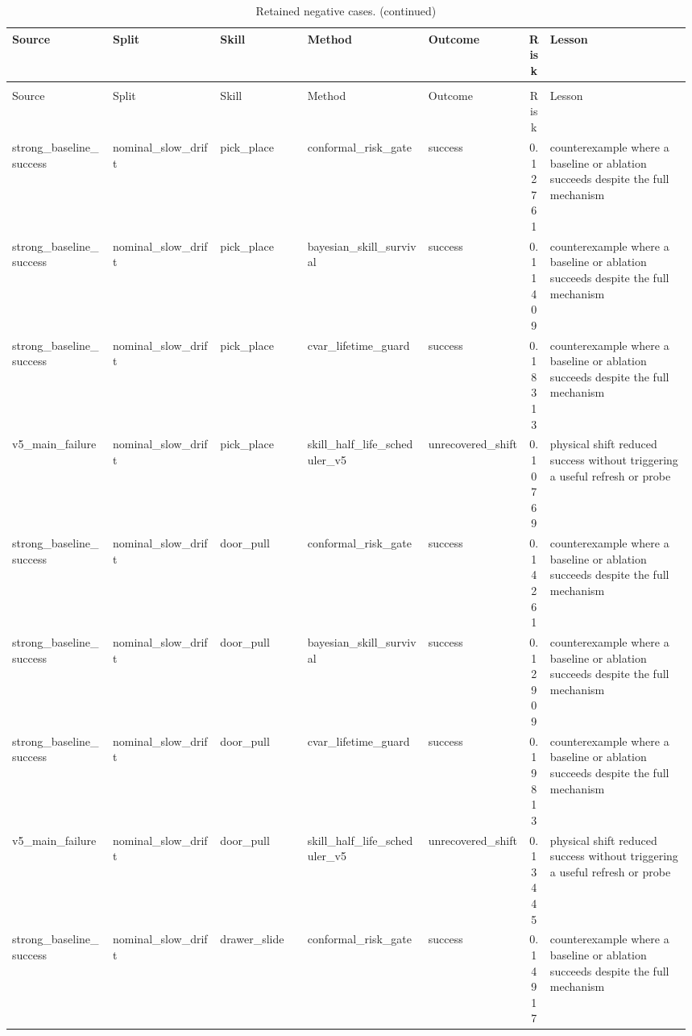 \documentclass{article}
\begin{document}
\begin{center}
\scriptsize
\begin{longtable}{p{0.15\linewidth}p{0.16\linewidth}p{0.13\linewidth}p{0.18\linewidth}p{0.15\linewidth}cp{0.21\linewidth}}
\caption{Retained negative cases.}\label{tab:negative-cases}\\
\toprule
Source & Split & Skill & Method & Outcome & Risk & Lesson\\
\midrule
\endfirsthead
\caption[]{Retained negative cases. (continued)}\\
\toprule
Source & Split & Skill & Method & Outcome & Risk & Lesson\\
\midrule
\endhead
strong\_baseline\_success & nominal\_slow\_drift & pick\_place & conformal\_risk\_gate & success & 0.12761 & counterexample where a baseline or ablation succeeds despite the full mechanism\\
strong\_baseline\_success & nominal\_slow\_drift & pick\_place & bayesian\_skill\_survival & success & 0.11409 & counterexample where a baseline or ablation succeeds despite the full mechanism\\
strong\_baseline\_success & nominal\_slow\_drift & pick\_place & cvar\_lifetime\_guard & success & 0.18313 & counterexample where a baseline or ablation succeeds despite the full mechanism\\
v5\_main\_failure & nominal\_slow\_drift & pick\_place & skill\_half\_life\_scheduler\_v5 & unrecovered\_shift & 0.10769 & physical shift reduced success without triggering a useful refresh or probe\\
strong\_baseline\_success & nominal\_slow\_drift & door\_pull & conformal\_risk\_gate & success & 0.14261 & counterexample where a baseline or ablation succeeds despite the full mechanism\\
strong\_baseline\_success & nominal\_slow\_drift & door\_pull & bayesian\_skill\_survival & success & 0.12909 & counterexample where a baseline or ablation succeeds despite the full mechanism\\
strong\_baseline\_success & nominal\_slow\_drift & door\_pull & cvar\_lifetime\_guard & success & 0.19813 & counterexample where a baseline or ablation succeeds despite the full mechanism\\
v5\_main\_failure & nominal\_slow\_drift & door\_pull & skill\_half\_life\_scheduler\_v5 & unrecovered\_shift & 0.13445 & physical shift reduced success without triggering a useful refresh or probe\\
strong\_baseline\_success & nominal\_slow\_drift & drawer\_slide & conformal\_risk\_gate & success & 0.14917 & counterexample where a baseline or ablation succeeds despite the full mechanism\\

\end{longtable}
\end{center}
\end{document}
